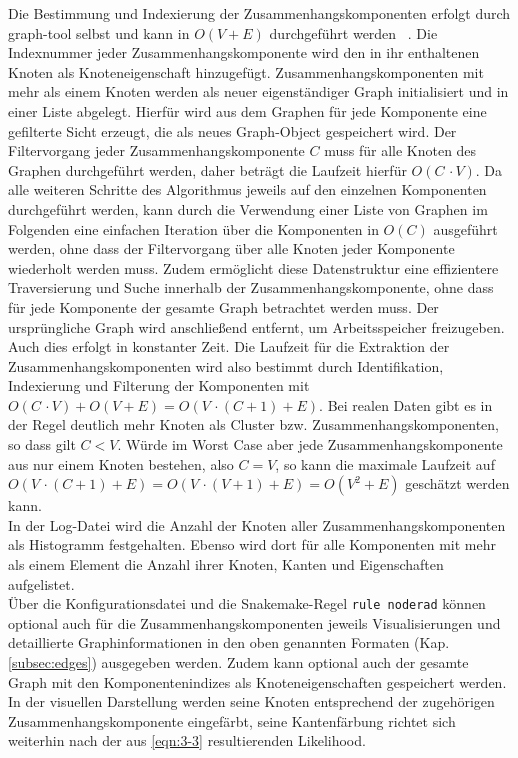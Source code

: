 Die Bestimmung und Indexierung der Zusammenhangskomponenten erfolgt durch graph-tool selbst und kann in $ O(V + E) $ durchgeführt werden ~\cite{docs_graph_tool}. Die Indexnummer jeder Zusammenhangskomponente wird den in ihr enthaltenen Knoten als Knoteneigenschaft hinzugefügt. Zusammenhangskomponenten mit mehr als einem Knoten  werden als neuer eigenständiger Graph initialisiert und in einer Liste abgelegt. Hierfür wird aus dem Graphen für jede Komponente eine gefilterte Sicht erzeugt, die als neues Graph-Object gespeichert wird. Der Filtervorgang jeder Zusammenhangskomponente $ C $ muss für alle Knoten des Graphen durchgeführt werden, daher beträgt die Laufzeit hierfür $ O(C \, \cdotp V) $. Da alle weiteren Schritte des Algorithmus jeweils auf den einzelnen Komponenten durchgeführt werden, kann durch die Verwendung einer Liste von Graphen im Folgenden eine einfachen Iteration über die Komponenten in $ O(C) $ ausgeführt werden, ohne dass der Filtervorgang über alle Knoten jeder Komponente wiederholt werden muss. Zudem ermöglicht diese Datenstruktur eine effizientere Traversierung und Suche innerhalb der Zusammenhangskomponente, ohne dass für jede Komponente der gesamte Graph betrachtet werden muss. Der ursprüngliche Graph wird anschließend entfernt, um Arbeitsspeicher freizugeben. Auch dies erfolgt in konstanter Zeit. Die Laufzeit für die Extraktion der Zusammenhangskomponenten wird also bestimmt durch Identifikation, Indexierung und Filterung der Komponenten mit $ O(C \, \cdotp V) + O(V + E) = O(V \, \cdotp (C + 1) +E)$. Bei realen Daten gibt es in der Regel deutlich mehr Knoten als Cluster bzw. Zusammenhangskomponenten, so dass gilt $ C < V $. Würde im Worst Case aber jede Zusammenhangskomponente aus nur einem Knoten bestehen, also $ C = V $, so kann die maximale Laufzeit auf $ O(V \, \cdotp (C + 1) +E) = O(V \, \cdotp (V + 1) + E) = O(V^2 + E) $ geschätzt werden kann.\\

In der Log-Datei wird die Anzahl der Knoten aller Zusammenhangskomponenten als Histogramm festgehalten. Ebenso wird dort für alle Komponenten mit mehr als einem Element die Anzahl ihrer Knoten, Kanten und Eigenschaften aufgelistet.\\

Über die Konfigurationsdatei und die Snakemake-Regel \lstinline|rule noderad| können optional auch für die Zusammenhangskomponenten jeweils Visualisierungen und detaillierte Graphinformationen in den oben genannten Formaten (Kap. \ref{subsec:edges}) ausgegeben werden. Zudem kann optional auch der gesamte Graph mit den Komponentenindizes als Knoteneigenschaften gespeichert werden. In der visuellen Darstellung werden seine Knoten entsprechend der zugehörigen Zusammenhangskomponente eingefärbt, seine Kantenfärbung richtet sich weiterhin nach der aus \eqref{eqn:3-3} resultierenden Likelihood.


